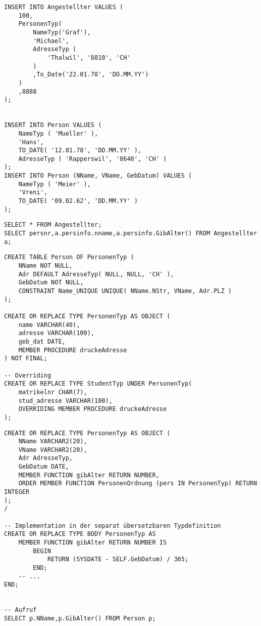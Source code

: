 \documentclass[ngerman,a4paper,12pt]{scrreprt}
\begin{document}
\begin{verbatim}
INSERT INTO Angestellter VALUES (
    100, 
    PersonenTyp(
        NameTyp('Graf'),
        'Michael',
        AdresseTyp (
            'Thalwil', '8810', 'CH'
        )
        ,To_Date('22.01.78', 'DD.MM.YY')
    )
    ,8888
);


INSERT INTO Person VALUES (
    NameTyp ( 'Mueller' ),
    'Hans',
    TO_DATE( '12.01.78', 'DD.MM.YY' ),
    AdresseTyp ( 'Rapperswil', '8640', 'CH' )
);
INSERT INTO Person (NName, VName, GebDatum) VALUES (
    NameTyp ( 'Meier' ),
    'Vreni',
    TO_DATE( '09.02.62', 'DD.MM.YY' )
);
\end{verbatim}

\begin{verbatim}
SELECT * FROM Angestellter;
SELECT persnr,a.persinfo.nname,a.persinfo.GibAlter() FROM Angestellter a;
\end{verbatim}

\begin{verbatim}
CREATE TABLE Person OF PersonenTyp (
    NName NOT NULL,
    Adr DEFAULT AdresseTyp( NULL, NULL, 'CH' ),
    GebDatum NOT NULL,
    CONSTRAINT Name_UNIQUE UNIQUE( NName.NStr, VName, Adr.PLZ )
);

CREATE OR REPLACE TYPE PersonenTyp AS OBJECT (
    name VARCHAR(40),
    adresse VARCHAR(100),
    geb_dat DATE,
    MEMBER PROCEDURE druckeAdresse
) NOT FINAL;

-- Overriding
CREATE OR REPLACE TYPE StudentTyp UNDER PersonenTyp(
    matrikelnr CHAR(7),
    stud_adresse VARCHAR(100),
    OVERRIDING MEMBER PROCEDURE druckeAdresse
);

\end{verbatim}

\begin{verbatim}
CREATE OR REPLACE TYPE PersonenTyp AS OBJECT (
    NName VARCHAR2(20),
    VName VARCHAR2(20),
    Adr AdresseTyp,
    GebDatum DATE,
    MEMBER FUNCTION gibAlter RETURN NUMBER,
    ORDER MEMBER FUNCTION PersonenOrdnung (pers IN PersonenTyp) RETURN INTEGER
);
/

-- Implementation in der separat übersetzbaren Typdefinition
CREATE OR REPLACE TYPE BODY PersonenTyp AS
    MEMBER FUNCTION gibAlter RETURN NUMBER IS
        BEGIN
            RETURN (SYSDATE - SELF.GebDatum) / 365;
        END;
    -- ...
END;


-- Aufruf
SELECT p.NName,p.GibAlter() FROM Person p;
\end{verbatim}
\end{document}
